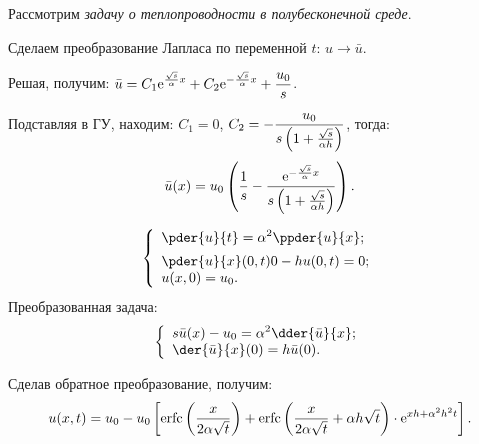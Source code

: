 \begin{minipage}{.6\textwidth}
    Рассмотрим \emph{задачу о теплопроводности в полубесконечной среде}.

    Сделаем преобразование Лапласа по переменной \( t \): \( u \to \bar{u} \).
        
    Решая, получим: \( \displaystyle \bar{u} = C_1\mathrm{e}^{\frac{\sqrt{s}}{\alpha}x} +
    C_2\mathrm{e}^{-\frac{\sqrt{s}}{\alpha}x} + \frac{u_0}{s} \).

    Подставляя в ГУ, находим: \( C_1 = 0 \), \( \displaystyle C_2 =
    -\frac{u_0}{s\left(1 + \frac{\sqrt{s}}{\alpha h}\right)} \), тогда:
    \[
        \bar{u}(x) = u_0\left(\frac{1}{s} - \frac{\mathrm{e}^{-\frac{\sqrt{s}}{\alpha}x}}
        {s\left(1 + \frac{\sqrt{s}}{\alpha h}\right)}\right).
    \]
\end{minipage}
\hfill
\begin{minipage}{.3\textwidth}
    \flushright
    \[
        \left\{ \begin{array}{l}
            \ds \pder{u}{t} = \alpha^2 \ppder{u}{x}; \\[.5em]
            \ds \pder{u}{x}(0,t) 0 - hu(0, t) = 0; \\
            u(x, 0) = u_0.
        \end{array} \right.
    \]
    Преобразованная задача:
    \[
        \left\{ \begin{array}{l}
            \ds s\bar{u}(x) - u_0 = \alpha^2\dder{\bar{u}}{x}; \\
            \ds \der{\bar{u}}{x}(0) = h\bar{u}(0).
        \end{array} \right.
    \]
\end{minipage}

Сделав обратное преобразование, получим:
\[
    u(x, t) = u_0 - u_0\left[\mathrm{erfc}\left(\frac{x}{2\alpha\sqrt{t}}\right) + 
    \mathrm{erfc}\left(\frac{x}{2\alpha\sqrt{t}} + \alpha h\sqrt{t}\right)\cdot
    \mathrm{e}^{xh + \alpha^2h^2 t}\right].
\]

\newpage
